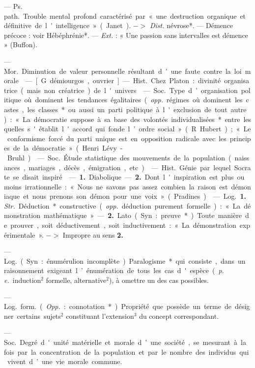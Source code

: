 \begin{itemize}[leftmargin=1cm, label=, itemsep=1pt]
 — \si{Ps. path.} Trouble mental
profond caractérisé par « une destruction organique et définitive de
l'intelligence » (Janet). $->$ {\it Dist.}
névrose*. — Démence précoce : voir
Hébéphrénie*. — {\it Ext.} : « Une passion sans intervalles est démence »
(Buffon).

 — \si{Mor.} Diminution de
valeur personnelle résultant d’une
faute contre la loi morale.

 — [G. démiourgos, ouvrier]
— \si{Hist.} Chez Platon : divinité organisatrice (mais non créatrice) de
l'univers.

 — \si{Soc.} Type d’organisation politique où dominent les
tendances égalitaires ({\it opp.} régimes
où dominent les castes, les classes*
ou aussi un parti politique à l'exclusion de tout autre) : « La démocratie suppose à sa base des volontés
individualisées* entre lesquelles
s'établit l'accord qui fonde l’ordre
social » (R. Hubert); « Le conformisme forcé du parti unique est
en opposition radicale avec les principes de la démocratie » (Henri
Lévy-Bruhl).

 — \si{Soc.} Étude statistique des mouvements de la population (naissances, mariages, décès, émigration, etc.).

 — \si{Hist.} Génie par
lequel Socrate se disait inspiré.

 — {\bf 1.} Diabolique. — {\bf 2.}
Dont l'inspiration est plus ou moins
irrationnelle : « Nous ne savons pas
assez combien la raison est démoniaque et nous prenons son démon
pour une voix » (Pradines).

 — \si{Log.} {\bf 1.} {\it Str.} Déduction* constructive ({\it opp.} déduction
purement formelle) : « La démonstration mathématique ». — {\bf 2.} Lato
(Syn. : preuve*). Toute manière de
prouver, soit déductivement, soit
inductivement : « La démonstration
expérimentale ». $->$ Impropre au
sens {\bf 2.}

 — \si{Log.}
(Syn. : énumérulion incomplète).
Paralogisme* qui consiste, dans un
raisonnement exigeant l’énumération de tous les cas d'espèce ({\it p. e.}
induction$^2$ formelle, alternative$^2$), à
omettre un des cas possibles.

 — \si{Log.} \si{form.} ({\it Opp.} : connotation*). Propriété que possède un
terme de désigner certains sujets$^2$
constituant l'extension$^3$ du concept
correspondant.

 — \si{Soc.} Degré d'unité
matérielle et morale d’une société,
se mesurant à la fois par la concentration de la population et par le
nombre des individus qui vivent
d’une vie morale commune.


\end{itemize}
